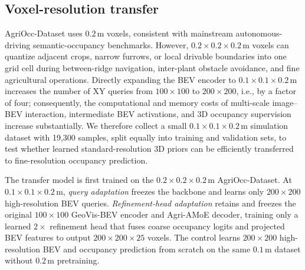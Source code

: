 \documentclass[a4paper,fleqn]{cas-sc}
\begin{document}
\subsection{Voxel-resolution transfer}\label{sec:resolution_transfer}
AgriOcc-Dataset uses $0.2\,\mathrm{m}$ voxels, consistent with mainstream autonomous-driving semantic-occupancy benchmarks\citep{behley2019semantickitti,li2024sscbench}. However, $0.2\times0.2\times0.2\,\mathrm{m}$ voxels can quantize adjacent crops, narrow furrows, or local drivable boundaries into one grid cell during between-ridge navigation, inter-plant obstacle avoidance, and fine agricultural operations. Directly expanding the BEV encoder to $0.1\times0.1\times0.2\,\mathrm{m}$ increases the number of XY queries from $100\times100$ to $200\times200$, i.e., by a factor of four; consequently, the computational and memory costs of multi-scale image--BEV interaction, intermediate BEV activations, and 3D occupancy supervision increase substantially. We therefore collect a small $0.1\times0.1\times0.2\,\mathrm{m}$ simulation dataset with 19,300 samples, split equally into training and validation sets, to test whether learned standard-resolution 3D priors can be efficiently transferred to fine-resolution occupancy prediction.

The transfer model is first trained on the $0.2\times0.2\times0.2\,\mathrm{m}$ AgriOcc-Dataset. At $0.1\times0.1\times0.2\,\mathrm{m}$, \emph{query adaptation} freezes the backbone and learns only $200\times200$ high-resolution BEV queries. \emph{Refinement-head adaptation} retains and freezes the original $100\times100$ GeoVis-BEV encoder and Agri-AMoE decoder, training only a learned $2\times$ refinement head that fuses coarse occupancy logits and projected BEV features to output $200\times200\times25$ voxels. The control learns $200\times200$ high-resolution BEV and occupancy prediction from scratch on the same $0.1\,\mathrm{m}$ dataset without $0.2\,\mathrm{m}$ pretraining.
\begin{table}[pos=htbp]\centering
\caption{Transfer results at $0.1\,\mathrm{m}$ voxel resolution (IoU in \%; time is end-to-end wall-clock time for 8 epochs including per-epoch validation). Transfer methods first train at $0.2\times0.2\times0.2\,\mathrm{m}$, then freeze the backbone and adapt to $0.1\times0.1\times0.2\,\mathrm{m}$.}
\label{tab:resolution_transfer}\fontsize{9}{11}\selectfont\setlength{\tabcolsep}{2.4pt}\end{table}
\end{document}
